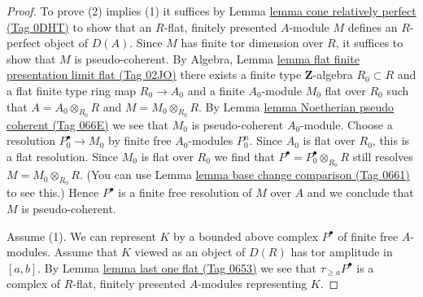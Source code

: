 \documentclass{amsart}
\theoremstyle{plain}
\theoremstyle{definition}
\theoremstyle{remark}
\numberwithin{equation}{subsection}
\begin{document}
\begin{proof}
To prove (2) implies (1) it suffices by
Lemma \href{https://stacks.math.columbia.edu/tag/0DHT}{lemma cone relatively perfect (Tag 0DHT)}
to show that an $R$-flat, finitely presented $A$-module $M$ defines
an $R$-perfect object of $D(A)$. Since $M$ has finite tor dimension
over $R$, it suffices to show that $M$ is pseudo-coherent. By
Algebra, Lemma \href{https://stacks.math.columbia.edu/tag/02JO}{lemma flat finite presentation limit flat (Tag 02JO)}
there exists a finite type $\mathbf{Z}$-algebra $R_0 \subset R$
and a flat finite type ring map $R_0 \to A_0$ and
a finite $A_0$-module $M_0$ flat over $R_0$ such that
$A = A_0 \otimes_{R_0} R$ and $M = M_0 \otimes_{R_0} R$. By
Lemma \href{https://stacks.math.columbia.edu/tag/066E}{lemma Noetherian pseudo coherent (Tag 066E)}
we see that $M_0$ is pseudo-coherent $A_0$-module.
Choose a resolution $P_0^\bullet \to M_0$ by finite free
$A_0$-modules $P_0^n$. Since $A_0$ is flat over $R_0$,
this is a flat resolution. Since $M_0$ is flat over $R_0$
we find that $P^\bullet = P_0^\bullet \otimes_{R_0} R$
still resolves $M = M_0 \otimes_{R_0} R$. (You can use
Lemma \href{https://stacks.math.columbia.edu/tag/0661}{lemma base change comparison (Tag 0661)} to see this.)
Hence $P^\bullet$ is a finite free resolution of $M$
over $A$ and we conclude that $M$ is pseudo-coherent.

\medskip\noindent
Assume (1). We can represent $K$ by a bounded above complex
$P^\bullet$ of finite free $A$-modules. Assume that
$K$ viewed as an object of $D(R)$ has tor amplitude in $[a, b]$.
By Lemma \href{https://stacks.math.columbia.edu/tag/0653}{lemma last one flat (Tag 0653)} we see that
$\tau_{\geq a}P^\bullet$ is a complex of $R$-flat, finitely
presented $A$-modules representing $K$.
\end{proof}
\end{document}
